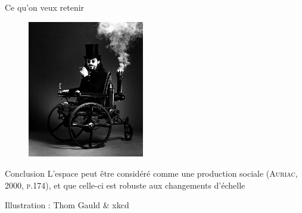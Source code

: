 \documentclass[newPxFont]{beamer}
\begin{document}
\begin{frame}[c]{Ce qu'on veux retenir}
  \vspace{-2em}

  \begin{figure}
   \includegraphics[height=6cm]{img/a_www.jpg}
  \end{figure}
\end{frame}
\begin{frame}[c]{Conclusion}
\vspace{-2em}
L'espace peut être considéré comme une production sociale (\textsc{Auriac, 2000, p.174}), et que celle-ci est robuste aux changements d'échelle
\end{frame}

{
%
\begin{frame}
  \begin{minipage}[t][.8\textheight]{\textwidth}

    \vfill

    \hfill {}

    \hfill \small{Illustration : Thom Gauld \& xkcd}
  \end{minipage}

\end{frame}
}
\end{document}
